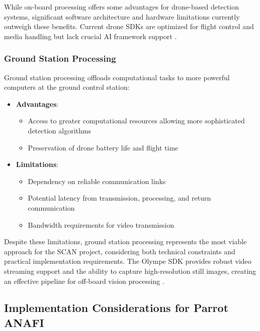 While on-board processing offers some advantages for drone-based detection systems, significant software architecture and hardware limitations currently outweigh these benefits. Current drone SDKs are optimized for flight control and media handling but lack crucial AI framework support \cite{ParrotOlympeDoc, Pelliccione2020}.

\subsubsection{Ground Station Processing}

Ground station processing offloads computational tasks to more powerful computers at the ground control station:

\begin{itemize}
    \item \textbf{Advantages}:
    \begin{itemize}
        \item Access to greater computational resources allowing more sophisticated detection algorithms \cite{Cavaliere2019}
        \item Preservation of drone battery life and flight time \cite{AlKaff2018}
    \end{itemize}
    
    \item \textbf{Limitations}:
    \begin{itemize}
        \item Dependency on reliable communication links \cite{Chmaj2015}
        \item Potential latency from transmission, processing, and return communication \cite{Cavaliere2019}
        \item Bandwidth requirements for video transmission \cite{Yanmaz2018}
    \end{itemize}
\end{itemize}

Despite these limitations, ground station processing represents the most viable approach for the SCAN project, considering both technical constraints and practical implementation requirements. The Olympe SDK provides robust video streaming support and the ability to capture high-resolution still images, creating an effective pipeline for off-board vision processing \cite{ParrotOlympeDoc}.

\subsection{Implementation Considerations for Parrot ANAFI}

